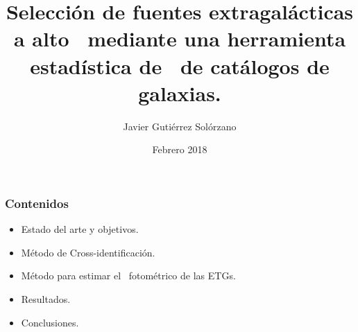 \documentclass[8pt]{beamer}
\begin{document}
\begin{frame}
\title{Selección de fuentes extragalácticas a alto \rt\ mediante una herramienta estadística de
\cross\ de catálogos de galaxias.}
\author{Javier Gutiérrez Solórzano}
\date{Febrero 2018}

\maketitle

\end{frame}


\begin{frame}
\frametitle{Contenidos}

\begin{itemize}
\item \large {Estado del arte y objetivos.}
\item \large {Método de Cross-identificación.}
\item \large {Método para estimar el \rt\ fotométrico de las ETGs.}

\item \large {Resultados.}

\item \large {Conclusiones.}

\end{itemize}

\end{frame}
\end{document}
